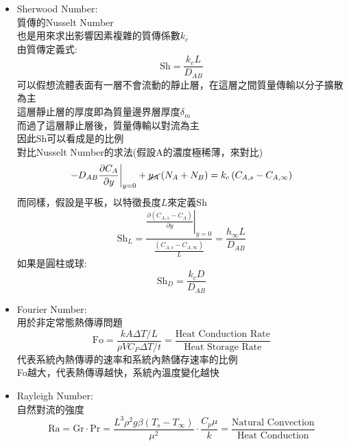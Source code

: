 \documentclass[../main.tex]{subfiles}
\begin{document}
\begin{itemize}
\begin{itemize}
  \item Sherwood Number:\\
    質傳的Nusselt Number\\
    也是用來求出影響因素複雜的質傳係數$k_c$\\
    由質傳定義式:
    \begin{equation}
      \text{Sh} = \frac{k_c L}{D_{AB}}
    \end{equation}
    可以假想流體表面有一層不會流動的靜止層，在這層之間質量傳輸以分子擴散為主\\
    這層靜止層的厚度即為質量邊界層厚度$\delta_m$\\
    而過了這層靜止層後，質量傳輸以對流為主\\
    因此Sh可以看成是的比例\\
    對比Nusselt Number的求法(假設A的濃度極稀薄，來對比)
    \begin{equation}
      -D_{AB}\frac{\partial C_A}{\partial y}\bigg|_{y=0} + \cancel{y_A}\left(
        N_A + N_B
      \right) = k_c\left(C_{A,s} - C_{A,\infty}\right)
    \end{equation}
    而同樣，假設是平板，以特徵長度$L$來定義Sh
    \begin{equation}
      \text{Sh}_L = \frac{\left.\frac{\partial \left(C_{A,s} - C_A\right)}{\partial y}\right|_{y=0}}{\frac{\left(C_{A,s}-C_{A,\infty}\right)}{L}} = \frac{h_\infty L}{D_{AB}}
    \end{equation}
    如果是圓柱或球:
    \begin{equation}
      \text{Sh}_D = \frac{k_c D}{D_{AB}}
    \end{equation}
  \item Fourier Number:\\
    用於非定常態熱傳導問題
    \begin{equation}
      \text{Fo} = \frac{kA\Delta T/L}{\rho V C_P \Delta T/t} = \frac{\text{Heat Conduction Rate}}{\text{Heat Storage Rate}}
    \end{equation}
    代表系統內熱傳導的速率和系統內熱儲存速率的比例\\
    Fo越大，代表熱傳導越快，系統內溫度變化越快
  \item Rayleigh Number:\\
    自然對流的強度
    \begin{equation}
      \text{Ra} = \text{Gr}\cdot \text{Pr} = \frac{L^3\rho^2g\beta\left(T_s-T_\infty\right)}{\mu^2} \cdot \frac{C_p\mu}{k}
      = \frac{\text{Natural Convection}}{\text{Heat Conduction}}
    \end{equation}

\end{itemize}
\end{itemize}
\end{document}
